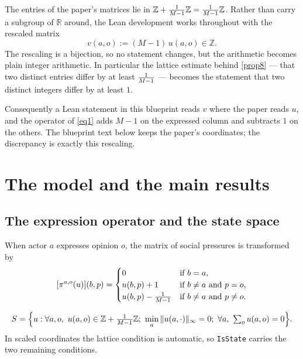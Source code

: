 \begin{remark}
  \label{note-scaling}
  The entries of the paper's matrices lie in $\mathbb{Z} + \tfrac{1}{M-1} \mathbb{Z}
  = \tfrac{1}{M-1} \mathbb{Z}$.  Rather than carry a subgroup of $\mathbb{R}$ around,
  the Lean development works throughout with the rescaled matrix
  \[ v(a,o) := (M-1)\, u(a,o) \in \mathbb{Z} . \]
  The rescaling is a bijection, so no statement changes, but the arithmetic
  becomes plain integer arithmetic.  In particular the lattice estimate behind
  \ref{prop8} — that two distinct entries differ by at least $\tfrac{1}{M-1}$ —
  becomes the statement that two distinct integers differ by at least $1$.

  Consequently a Lean statement in this blueprint reads $v$ where the paper
  reads $u$, and the operator of \ref{eq1} adds $M-1$ on the expressed column
  and subtracts $1$ on the others.  The blueprint text below keeps the paper's
  coordinates; the discrepancy is exactly this rescaling.
\end{remark}

\chapter{The model and the main results}

\section{The expression operator and the state space}

\begin{definition}
  \label{eq1}
  \leanok
  When actor $a$ expresses opinion $o$, the matrix of social pressures is
  transformed by
  \[
    [\pi^{a,o}(u)](b,p) =
    \begin{cases}
      0 & \text{if } b = a, \\
      u(b,p) + 1 & \text{if } b \ne a \text{ and } p = o, \\
      u(b,p) - \tfrac{1}{M-1} & \text{if } b \ne a \text{ and } p \ne o.
    \end{cases}
  \]
\end{definition}

\begin{definition}
  \label{eq2}
  \leanok
  \[
    S = \Bigl\{ u : \forall a, o,\ u(a,o) \in \mathbb{Z} + \tfrac{1}{M-1}\mathbb{Z};\
      \min_{a} \|u(a,\cdot)\|_\infty = 0;\
      \forall a,\ \textstyle\sum_{o} u(a,o) = 0 \Bigr\}.
  \]
  In scaled coordinates the lattice condition is automatic, so
  \texttt{IsState} carries the two remaining conditions.
\end{definition}

